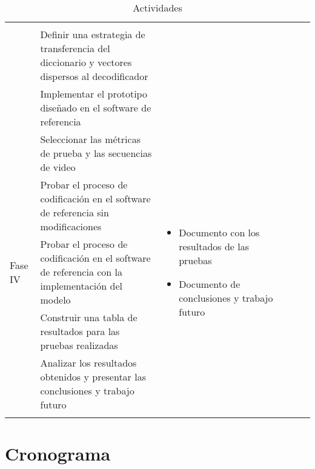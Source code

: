 \begin{longtable}{|p{0.1\linewidth}|m{0.4\linewidth}|p{0.4\linewidth}|p{0.23\linewidth}|}
{\begin{itemize}[leftmargin=*]
\end{itemize}}\\
 \cline{2-2}
  & Definir una estrategia de transferencia del diccionario y vectores dispersos al decodificador  & \\
\cline{2-2}
  & Implementar el prototipo dise\~nado en el software de referencia & \\
\hline
\multirow{5}{*}{Fase IV}  & Seleccionar las m\'etricas de prueba y las secuencias de video & \multirow{5}{\linewidth}{
\begin{itemize}[leftmargin=*]
    \item Documento con los resultados de las pruebas 
    \item Documento de conclusiones y trabajo futuro
\end{itemize}}\\
\cline{2-2}
  & Probar el proceso de codificaci\'on en el software de referencia sin modificaciones   & \\
 \cline{2-2}
   & Probar el proceso de codificaci\'on en el software de referencia con la implementaci\'on del modelo & \\
   \cline{2-2}
   & Construir una tabla de resultados para las pruebas realizadas  & \\
  \cline{2-2}
   & Analizar los resultados obtenidos y presentar las conclusiones y trabajo futuro & \\
\hline
\caption{Actividades}
\label{tab:activities}
\end{longtable}

\newpage
\section{Cronograma}

\normalsize



